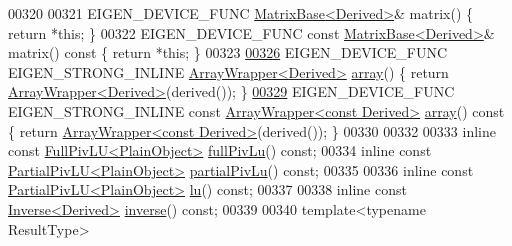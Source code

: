 \begin{DoxyCode}
00320 
00321     EIGEN\_DEVICE\_FUNC \hyperlink{group___core___module_class_eigen_1_1_matrix_base}{MatrixBase<Derived>}& matrix() \{ \textcolor{keywordflow}{return} *\textcolor{keyword}{this}; \}
00322     EIGEN\_DEVICE\_FUNC \textcolor{keyword}{const} \hyperlink{group___core___module_class_eigen_1_1_matrix_base}{MatrixBase<Derived>}& matrix()\textcolor{keyword}{ const }\{ \textcolor{keywordflow}{return} *\textcolor{keyword}{this}; \}
00323 
\hyperlink{group___core___module_a76a9dcb91ec82fbd6e74ca2ac2ae0e07}{00326}     EIGEN\_DEVICE\_FUNC EIGEN\_STRONG\_INLINE \hyperlink{group___core___module_class_eigen_1_1_array_wrapper}{ArrayWrapper<Derived>} 
      \hyperlink{group___core___module_a76a9dcb91ec82fbd6e74ca2ac2ae0e07}{array}() \{ \textcolor{keywordflow}{return} \hyperlink{group___core___module_class_eigen_1_1_array_wrapper}{ArrayWrapper<Derived>}(derived()); \}
\hyperlink{group___core___module_a3cb1d2fad4e444eaa3ebca2d7db75a5e}{00329}     EIGEN\_DEVICE\_FUNC EIGEN\_STRONG\_INLINE \textcolor{keyword}{const} \hyperlink{group___core___module_class_eigen_1_1_array_wrapper}{ArrayWrapper<const Derived>} 
      \hyperlink{group___core___module_a3cb1d2fad4e444eaa3ebca2d7db75a5e}{array}()\textcolor{keyword}{ const }\{ \textcolor{keywordflow}{return} \hyperlink{group___core___module_class_eigen_1_1_array_wrapper}{ArrayWrapper<const Derived>}(derived()); \}
00330 
00332 
00333     \textcolor{keyword}{inline} \textcolor{keyword}{const} \hyperlink{group___l_u___module_class_eigen_1_1_full_piv_l_u}{FullPivLU<PlainObject>} \hyperlink{group___core___module_a25da97d31acab0ee5d9d13bdbb0569da}{fullPivLu}() \textcolor{keyword}{const};
00334     \textcolor{keyword}{inline} \textcolor{keyword}{const} \hyperlink{group___l_u___module_class_eigen_1_1_partial_piv_l_u}{PartialPivLU<PlainObject>} \hyperlink{group___core___module_a6199d8aaf26c1b8ac3097fdfa7733a1e}{partialPivLu}() \textcolor{keyword}{const};
00335 
00336     \textcolor{keyword}{inline} \textcolor{keyword}{const} \hyperlink{group___l_u___module_class_eigen_1_1_partial_piv_l_u}{PartialPivLU<PlainObject>} \hyperlink{group___core___module_afb312afbfe960cbda67811552d876fae}{lu}() \textcolor{keyword}{const};
00337 
00338     \textcolor{keyword}{inline} \textcolor{keyword}{const} \hyperlink{class_eigen_1_1_inverse}{Inverse<Derived>} \hyperlink{group___core___module_a7712eb69e8ea3c8f7b8da1c44dbdeebf}{inverse}() \textcolor{keyword}{const};
00339 
00340     \textcolor{keyword}{template}<\textcolor{keyword}{typename} ResultType>

\end{DoxyCode}

